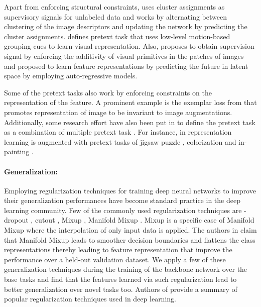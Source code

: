 \documentclass[10pt,twocolumn,letterpaper]{article}
\begin{document}
Apart from enforcing structural constraints, \cite{cluster2018self} uses cluster assignments as supervisory signals for unlabeled data and works by alternating between clustering of the image descriptors and updating the network by predicting the cluster assignments. \cite{moving_object2017} defines pretext task that uses low-level motion-based grouping cues to learn visual representation. Also, \cite{Noroozi2017count} proposes to obtain supervision signal by enforcing the additivity of visual primitives in the patches of images and \cite{oord2018cpc} proposed to learn feature representations by predicting the future in latent space by employing auto-regressive models.

Some of the pretext tasks also work by enforcing constraints on the representation of the feature. A prominent example is the exemplar loss from \cite{exemplar2014} that promotes representation of image to be invariant to image augmentations. Additionally, some research effort have also been put in to define the pretext task as a combination of multiple pretext task \cite{doersch2017multitask,damage_jigsaw_2018}. For instance, in \cite{damage_jigsaw_2018} representation learning is augmented with pretext tasks of jigsaw puzzle \cite{Noroozi2018jigsaw}, colorization \cite{color2018,color_2018_1} and in-painting \cite{painting2018}. 

\paragraph{Generalization:}
Employing regularization techniques for training deep neural networks to improve their generalization performances have become standard practice in the deep learning community. Few of the commonly used regularization techniques are - dropout \cite{srivastava2014dropout}, cutout \cite{devries2017improved}, Mixup \cite{zhang2018mixup}, Manifold Mixup \cite{verma2019manifold}. Mixup \cite{zhang2018mixup} is a specific case of Manifold Mixup \cite{verma2019manifold} where the interpolation of only input data is applied. The authors in \cite{verma2019manifold} claim that Manifold Mixup leads to smoother decision boundaries and flattens the class representations thereby leading to feature representation that improve the performance over a held-out validation dataset. We apply a few of these generalization techniques during the training of the backbone network over the base tasks and find that the features learned via such regularization lead to better generalization over novel tasks too. Authors of \cite{overview_2015_generalize} provide a summary of popular regularization techniques used in deep learning.
\vspace{-4pt}
\end{document}
